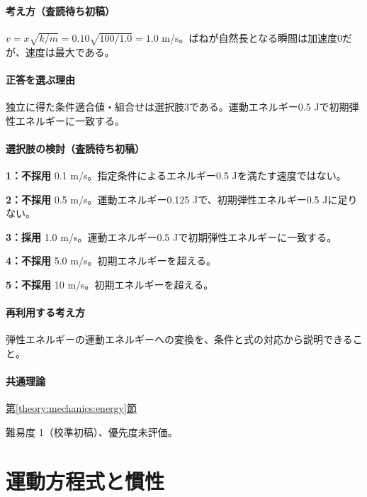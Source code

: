 \paragraph{考え方（査読待ち初稿）} \(v=x\sqrt{k/m}=0.10\sqrt{100/1.0}=1.0\) m/s。ばねが自然長となる瞬間は加速度0だが、速度は最大である。

\paragraph{正答を選ぶ理由} 独立に得た条件適合値・組合せは選択肢3である。運動エネルギー0.5 Jで初期弾性エネルギーに一致する。

\paragraph{選択肢の検討（査読待ち初稿）}\mbox{}\par

\noindent\textbf{1：不採用} 0.1 m/s。指定条件によるエネルギー0.5 Jを満たす速度ではない。\par

\noindent\textbf{2：不採用} 0.5 m/s。運動エネルギー0.125 Jで、初期弾性エネルギー0.5 Jに足りない。\par

\noindent\textbf{3：採用} 1.0 m/s。運動エネルギー0.5 Jで初期弾性エネルギーに一致する。\par

\noindent\textbf{4：不採用} 5.0 m/s。初期エネルギーを超える。\par

\noindent\textbf{5：不採用} 10 m/s。初期エネルギーを超える。\par

\paragraph{再利用する考え方} 弾性エネルギーの運動エネルギーへの変換を、条件と式の対応から説明できること。

\paragraph{共通理論} \hyperref[theory:mechanics:energy]{第\ref*{theory:mechanics:energy}節}

\par 難易度 1（校準初稿）、優先度未評価。

\section{運動方程式と慣性}

